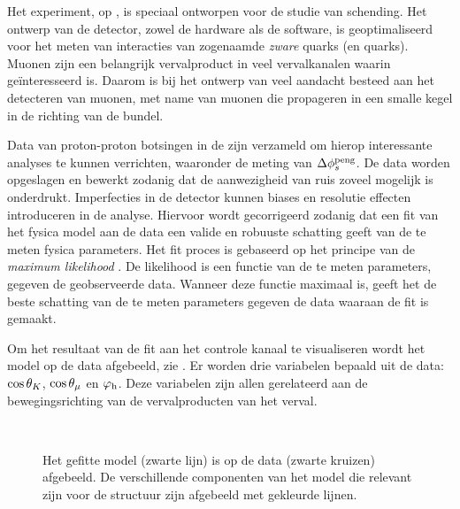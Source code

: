 Het \lhcb experiment, op \cern, is speciaal ontworpen voor de studie van \CP schending. Het ontwerp van de detector, zowel de hardware als de software, is geoptimaliseerd voor het meten van interacties van zogenaamde {\it zware} quarks (\bquark en \cquark quarks). Muonen zijn een belangrijk vervalproduct in veel vervalkanalen waarin \lhcb ge\"interesseerd is.  Daarom is bij het ontwerp van \lhcb veel aandacht besteed aan het detecteren van muonen, met name van muonen die propageren in een smalle kegel in de richting van de bundel.


Data van proton-proton botsingen in de \lhc zijn verzameld om hierop interessante analyses te kunnen verrichten, waaronder de meting van  $\Delta\phi_{s}^{\tiny\text{peng}}$. De data worden opgeslagen en bewerkt zodanig dat de aanwezigheid van ruis zoveel mogelijk is onderdrukt. Imperfecties in de detector kunnen biases en resolutie effecten introduceren in de analyse. Hiervoor wordt gecorrigeerd zodanig dat een fit van het fysica model aan de data een valide en robuuste schatting geeft van de te meten fysica parameters. Het fit proces is gebaseerd op het principe van de {\it maximum likelihood} \cite{cowan1998statistical}. De likelihood is een functie van de te meten parameters, gegeven de geobserveerde data. Wanneer deze functie maximaal is, geeft het de beste schatting van de te meten parameters gegeven de data waaraan de fit is gemaakt.

Om het resultaat van de fit aan het \BsJpsiKst controle kanaal te visualiseren wordt het model op de data
afgebeeld, zie . Er worden drie variabelen bepaald uit de data: $\cos\theta_{K}$,
$\cos\theta_{\mu}$ en $\varphi_{\rm h}$. Deze variabelen zijn allen gerelateerd aan de bewegingsrichting van de vervalproducten
van het \BsJpsiKst verval.

\begin{figure}[!t]
  \begin{subfigure}{0.5\textwidth}
    \centering
    \scalebox{1.2}{}
  \end{subfigure}%
  \hfill
  \begin{subfigure}{0.5\textwidth}
    \centering
    \scalebox{1.2}{}
  \end{subfigure}\\
  \begin{subfigure}{\textwidth}
    \centering
    \scalebox{1.2}{}
  \end{subfigure}
  \caption{Het gefitte model (zwarte lijn) is op de \BsJpsiKst data (zwarte kruizen) afgebeeld. De verschillende componenten van het model die relevant zijn voor de \CP structuur zijn afgebeeld met gekleurde lijnen.}
  \label{app_nl_angular_plot_thetas}
\end{figure}



